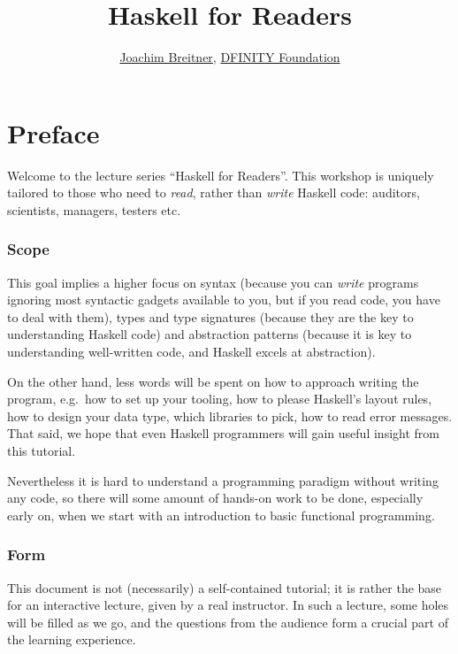 \documentclass[11pt,
  american,
  DIV13]{article}
\title{Haskell for Readers}
\author{\href{http://www.joachim-breitner.de/}{Joachim Breitner},
\href{https://dfinity.org/}{DFINITY Foundation}}
\date{}
\begin{document}
\maketitle

\newpage
{
\setcounter{tocdepth}{2}
\tableofcontents
}
\newpage


\section*{Preface}\label{preface}

Welcome to the lecture series ``Haskell for Readers''. This workshop is
uniquely tailored to those who need to \emph{read}, rather than
\emph{write} Haskell code: auditors, scientists, managers, testers etc.

\hypertarget{scope}{%
\subsubsection*{Scope}\label{scope}}

This goal implies a higher focus on syntax (because you can \emph{write}
programs ignoring most syntactic gadgets available to you, but if you
read code, you have to deal with them), types and type signatures
(because they are the key to understanding Haskell code) and abstraction
patterns (because it is key to understanding well-written code, and
Haskell excels at abstraction).

On the other hand, less words will be spent on how to approach writing
the program, e.g.~how to set up your tooling, how to please Haskell's
layout rules, how to design your data type, which libraries to pick, how
to read error messages. That said, we hope that even Haskell programmers
will gain useful insight from this tutorial.

Nevertheless it is hard to understand a programming paradigm without
writing any code, so there will some amount of hands-on work to be done,
especially early on, when we start with an introduction to basic
functional programming.

\hypertarget{form}{%
\subsubsection*{Form}\label{form}}

This document is not (necessarily) a self-contained tutorial; it is
rather the base for an interactive lecture, given by a real instructor.
In such a lecture, some holes will be filled as we go, and the questions
from the audience form a crucial part of the learning experience.
\end{document}
